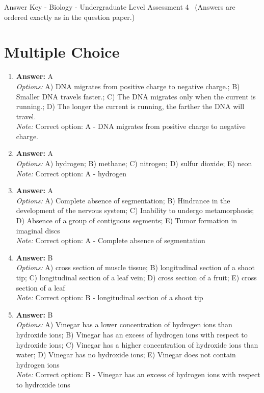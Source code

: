 \documentclass[12pt]{article}
\begin{document}
\begin{center}
Answer Key - Biology - Undergraduate Level Assessment 4 \
\small (Answers are ordered exactly as in the question paper.)
\end{center}

\section*{Multiple Choice}
\begin{enumerate}[label=\arabic*.]
\item \textbf{Answer:} A
\\ \textit{Options:} A) DNA migrates from positive charge to negative charge.; B) Smaller DNA travels faster.; C) The DNA migrates only when the current is running.; D) The longer the current is running, the farther the DNA will travel.
\\ \textit{Note:} Correct option: A - DNA migrates from positive charge to negative charge.
\item \textbf{Answer:} A
\\ \textit{Options:} A) hydrogen; B) methane; C) nitrogen; D) sulfur dioxide; E) neon
\\ \textit{Note:} Correct option: A - hydrogen
\item \textbf{Answer:} A
\\ \textit{Options:} A) Complete absence of segmentation; B) Hindrance in the development of the nervous system; C) Inability to undergo metamorphosis; D) Absence of a group of contiguous segments; E) Tumor formation in imaginal discs
\\ \textit{Note:} Correct option: A - Complete absence of segmentation
\item \textbf{Answer:} B
\\ \textit{Options:} A) cross section of muscle tissue; B) longitudinal section of a shoot tip; C) longitudinal section of a leaf vein; D) cross section of a fruit; E) cross section of a leaf
\\ \textit{Note:} Correct option: B - longitudinal section of a shoot tip
\item \textbf{Answer:} B
\\ \textit{Options:} A) Vinegar has a lower concentration of hydrogen ions than hydroxide ions; B) Vinegar has an excess of hydrogen ions with respect to hydroxide ions; C) Vinegar has a higher concentration of hydroxide ions than water; D) Vinegar has no hydroxide ions; E) Vinegar does not contain hydrogen ions
\\ \textit{Note:} Correct option: B - Vinegar has an excess of hydrogen ions with respect to hydroxide ions
\end{enumerate}
\end{document}

